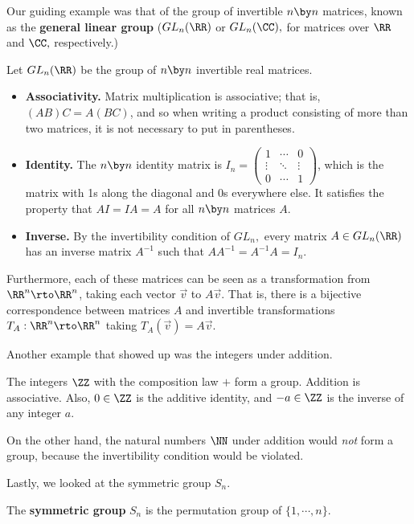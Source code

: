 Our guiding example was that of the group of invertible $n \by n$ matrices, known as the \textbf{general linear group} ($GL_n(\RR)$ or $GL_n(\CC),$ for matrices over $\RR$ and $\CC,$ respectively.) 
\begin{example}
Let $GL_n(\RR)$ be the group of $n \by n$ invertible real matrices. 
\begin{itemize}
    \item \textbf{Associativity.} Matrix multiplication is associative; that is, $(AB)C = A(BC)$, and so when writing a product consisting of more than two matrices, it is not necessary to put in parentheses. 
    \item \textbf{Identity.} The $n \by n$ identity matrix is $I_n = \begin{pmatrix}1 & \cdots & 0 \\ \vdots & \ddots & \vdots \\ 0 & \cdots & 1\end{pmatrix}$, which is the matrix with 1s along the diagonal and 0s everywhere else. It satisfies the property that $AI = IA = A$ for all $n \by n$ matrices $A$. 
    \item \textbf{Inverse.} By the invertibility condition of $GL_n,$ every matrix $A \in GL_n(\RR)$ has an inverse matrix $A^{-1}$ such that $AA^{-1} = A^{-1}A = I_n.$
\end{itemize}
\end{example}
Furthermore, each of these matrices can be seen as a transformation from $\RR^n \rto \RR^n$, taking each vector $\vec{v}$ to $A\vec{v}.$ That is, there is a bijective correspondence between matrices $A$ and invertible transformations $T_A: \RR^n \rto \RR^n$ taking $T_A(\vec{v}) = A\vec{v}.$

Another example that showed up was the integers under addition. 

\begin{example}
The integers $\ZZ$ with the composition law $+$ form a group. Addition is associative. Also, $0 \in \ZZ$ is the additive identity, and $-a \in \ZZ$ is the inverse of any integer $a.$
\end{example}
On the other hand, the natural numbers $\NN$ under addition would \emph{not} form a group, because the invertibility condition would be violated.

Lastly, we looked at the symmetric group $S_n.$ 

\begin{example}
The \textbf{symmetric group} $S_n$ is the permutation group of $\{1, \cdots, n\}.$ 
\end{example}

